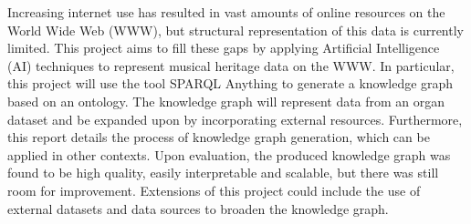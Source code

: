 Increasing internet use has resulted in vast amounts of online resources on the World Wide Web (WWW), but structural representation of this data is currently limited. This project aims to fill these gaps by applying Artificial Intelligence (AI) techniques to represent musical heritage data on the WWW. In particular, this project will use the tool SPARQL Anything to generate a knowledge graph based on an ontology. The knowledge graph will represent data from an organ dataset and be expanded upon by incorporating external resources. Furthermore, this report details the process of knowledge graph generation, which can be applied in other contexts. Upon evaluation, the produced knowledge graph was found to be high quality, easily interpretable and scalable, but there was still room for improvement. Extensions of this project could include the use of external datasets and data sources to broaden the knowledge graph. 
